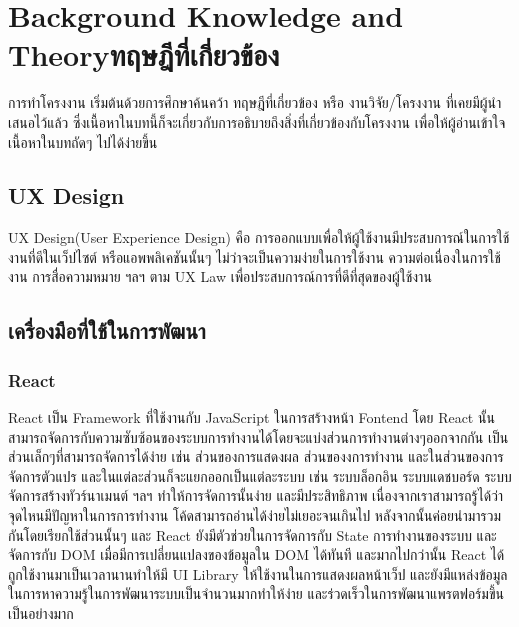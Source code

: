 \chapter{\ifenglish Background Knowledge and Theory\else ทฤษฎีที่เกี่ยวข้อง\fi}

การทำโครงงาน เริ่มต้นด้วยการศึกษาค้นคว้า ทฤษฎีที่เกี่ยวข้อง หรือ งานวิจัย/โครงงาน ที่เคยมีผู้นำเสนอไว้แล้ว ซึ่งเนื้อหาในบทนี้ก็จะเกี่ยวกับการอธิบายถึงสิ่งที่เกี่ยวข้องกับโครงงาน เพื่อให้ผู้อ่านเข้าใจเนื้อหาในบทถัดๆ ไปได้ง่ายขึ้น


\section{UX Design}
UX Design(User Experience Design) คือ การออกแบบเพื่อให้ผู้ใช้งานมีประสบการณ์ในการใช้งานที่ดีในเว็ปไซต์ หรือแอพพลิเคชันนั้นๆ
ไม่ว่าจะเป็นความง่ายในการใช้งาน ความต่อเนื่องในการใช้งาน การสื่อความหมาย ฯลฯ ตาม UX Law\cite{uxlaw} เพื่อประสบการณ์การที่ดีที่สุดของผู้ใช้งาน

\section{เครื่องมือที่ใช้ในการพัฒนา}
\subsection{React}
React เป็น Framework ที่ใช้งานกับ JavaScript ในการสร้างหน้า Fontend โดย React นั้นสามารถจัดการกับความซับซ้อนของระบบการทำงานได้โดยจะแบ่งส่วนการทำงานต่างๆออกจากกัน
เป็นส่วนเล็กๆที่สามารถจัดการได้ง่าย เช่น ส่วนของการแสดงผล ส่วนของงการทำงาน และในส่วนของการจัดการตัวแปร และในแต่ละส่วนก็จะแยกออกเป็นแต่ละระบบ เช่น ระบบล็อกอิน ระบบแดชบอร์ด ระบบจัดการสร้างทัวร์นาเมนต์ ฯลฯ 
ทำให้การจัดการนั้นง่าย และมีประสิทธิภาพ เนื่องจากเราสามารถรู้ได้ว่าจุดไหนมีปัญหาในการการทำงาน โค้ดสามารถอ่านได้ง่ายไม่เยอะจนเกินไป หลังจากนั้นค่อยนำมารวมกันโดยเรียกใช้ส่วนนั้นๆ และ React ยังมีตัวช่วยในการจัดการกับ State การทำงานของระบบ และจัดการกับ DOM
เมื่อมีการเปลี่ยนแปลงของข้อมูลใน DOM ได้ทันที และมากไปกว่านั้น React ได้ถูกใช้งานมาเป็นเวลานานทำให้มี UI Library ให้ใช้งานในการแสดงผลหน้าเว็ป และยังมีแหล่งข้อมูลในการหาความรู้ในการพัฒนาระบบเป็นจำนวนมากทำให้ง่าย และร่วดเร็วในการพัฒนาแพรตฟอร์มขึ้นเป็นอย่างมาก 

